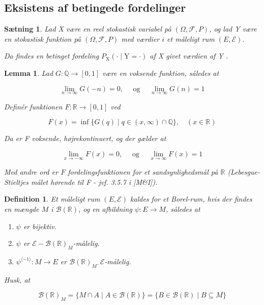 \documentclass{article}
\newcommand{\1}{\mathbbm{1}}
\theoremstyle{boxed}
\newtheorem{definition}[theorem]{Definition}
\newtheorem{lemma}[theorem]{Lemma}
\newtheorem{proposition}[theorem]{Sætning}
\begin{document}
\subsection{Eksistens af betingede fordelinger}
\begin{theorem-box}
    \begin{proposition}
        Lad X være en reel stokastisk variabel på $(\Omega, \mathcal{F}, P)$, og lad Y være en stokastisk funktion på $(\Omega, \mathcal{F}, P)$ med værdier $i$ et måleligt rum $(E, \mathcal{E})$.

Da findes en betinget fordeling $P_{\mathrm{X}}(\cdot \mid \mathrm{Y}=\cdot)$ af X givet værdien af Y .
    \end{proposition}
\end{theorem-box}
\begin{theorem-box}
    \begin{lemma}
        Lad $G: \mathbb{Q} \rightarrow[0,1]$ være en voksende funktion, således at

$$
\lim _{n \rightarrow \infty} G(-n)=0, \quad \text { og } \quad \lim _{n \rightarrow \infty} G(n)=1
$$


Definér funktionen $F: \mathbb{R} \rightarrow[0,1]$ ved

$$
F(x)=\inf \{G(q) \mid q \in(x, \infty) \cap \mathbb{Q}\}, \quad(x \in \mathbb{R})
$$


Da er F voksende, højrekontinuert, og der gælder at

$$
\lim _{x \rightarrow-\infty} F(x)=0, \quad \text { og } \quad \lim _{x \rightarrow \infty} F(x)=1
$$


Med andre ord er $F$ fordelingsfunktionen for et sandsynlighedsmål på $\mathbb{R}$ (Lebesgue-Stieltjes målet hørende til F - jvf. 3.5.7 i [M\&I]).
    \end{lemma}
\end{theorem-box}
\begin{theorem-box}
    \begin{definition}
        Et måleligt rum $(E, \mathcal{E})$ kaldes for et Borel-rum, hvis der findes en mængde $M$ i $\mathcal{B}(\mathbb{R})$, og en afbildning $\psi: E \rightarrow M$, således at
        \begin{enumerate}
            \item $\psi$ er bijektiv.
            \item $\psi$ er $\mathcal{E}-\mathcal{B}(\mathbb{R})_M$-målelig.
            \item $\psi^{\langle-1\rangle}: M \rightarrow E$ er $\mathcal{B}(\mathbb{R})_{M^{-}} \mathcal{E}$-målelig.
        \end{enumerate}
Husk, at

$$
\mathcal{B}(\mathbb{R})_M=\{M \cap A \mid A \in \mathcal{B}(\mathbb{R})\}=\{B \in \mathcal{B}(\mathbb{R}) \mid B \subseteq M\}
$$

    \end{definition}
\end{theorem-box}
\end{document}
